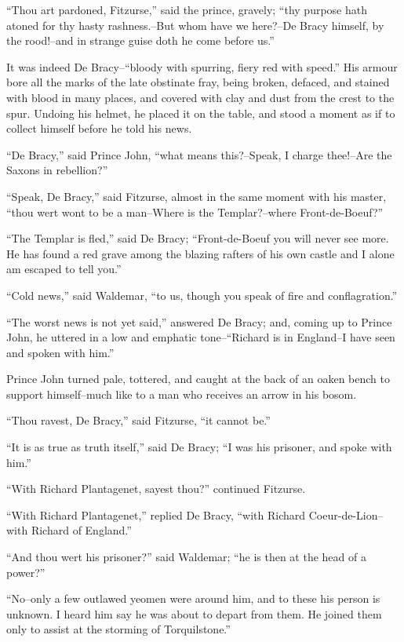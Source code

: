 ``Thou art pardoned, Fitzurse,'' said the prince, gravely; ``thy purpose
hath atoned for thy hasty rashness.--But whom have we here?--De Bracy
himself, by the rood!--and in strange guise doth he come before us.''

It was indeed De Bracy--``bloody with spurring, fiery red with speed.''
His armour bore all the marks of the late obstinate fray, being broken,
defaced, and stained with blood in many places, and covered with clay
and dust from the crest to the spur. Undoing his helmet, he placed it on
the table, and stood a moment as if to collect himself before he told
his news.

``De Bracy,'' said Prince John, ``what means this?--Speak, I charge
thee!--Are the Saxons in rebellion?''

``Speak, De Bracy,'' said Fitzurse, almost in the same moment with his
master, ``thou wert wont to be a man--Where is the Templar?--where
Front-de-Boeuf?''

``The Templar is fled,'' said De Bracy; ``Front-de-Boeuf you will never
see more. He has found a red grave among the blazing rafters of his own
castle and I alone am escaped to tell you.''

``Cold news,'' said Waldemar, ``to us, though you speak of fire and
conflagration.''

``The worst news is not yet said,'' answered De Bracy; and, coming up to
Prince John, he uttered in a low and emphatic tone--``Richard is in
England--I have seen and spoken with him.''

Prince John turned pale, tottered, and caught at the back of an oaken
bench to support himself--much like to a man who receives an arrow in
his bosom.

``Thou ravest, De Bracy,'' said Fitzurse, ``it cannot be.''

``It is as true as truth itself,'' said De Bracy; ``I was his prisoner,
and spoke with him.''

``With Richard Plantagenet, sayest thou?'' continued Fitzurse.

``With Richard Plantagenet,'' replied De Bracy, ``with Richard
Coeur-de-Lion--with Richard of England.''

``And thou wert his prisoner?'' said Waldemar; ``he is then at the head
of a power?''

``No--only a few outlawed yeomen were around him, and to these his
person is unknown. I heard him say he was about to depart from them. He
joined them only to assist at the storming of Torquilstone.''

